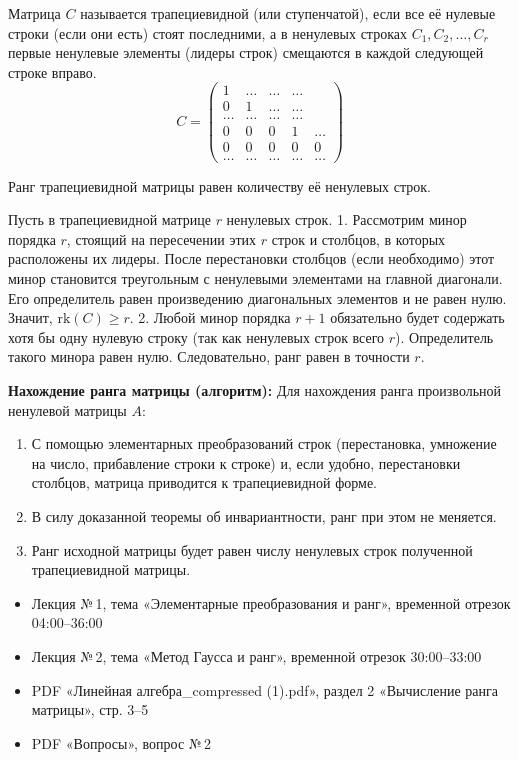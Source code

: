 \begin{definition}
Матрица $C$ называется трапециевидной (или ступенчатой), если все её нулевые строки (если они есть) стоят последними, а в ненулевых строках $C_1, C_2, \dots, C_r$ первые ненулевые элементы (лидеры строк) смещаются в каждой следующей строке вправо.
\[
C = \begin{pmatrix}
1 & \dots & \dots & \dots \\
0 & 1 & \dots & \dots \\
\dots & \dots & \dots & \dots \\
0 & 0 & 0 & 1 & \dots \\
0 & 0 & 0 & 0 & 0 \\
\dots & \dots & \dots & \dots & \dots
\end{pmatrix}
\]
\end{definition}

\begin{theorem}
Ранг трапециевидной матрицы равен количеству её ненулевых строк.
\end{theorem}

\begin{tcolorbox}[title=Доказательство, breakable]
Пусть в трапециевидной матрице $r$ ненулевых строк. 
1. Рассмотрим минор порядка $r$, стоящий на пересечении этих $r$ строк и столбцов, в которых расположены их лидеры. После перестановки столбцов (если необходимо) этот минор становится треугольным с ненулевыми элементами на главной диагонали. Его определитель равен произведению диагональных элементов и не равен нулю. Значит, $\mathrm{rk}(C) \ge r$.
2. Любой минор порядка $r+1$ обязательно будет содержать хотя бы одну нулевую строку (так как ненулевых строк всего $r$). Определитель такого минора равен нулю.
Следовательно, ранг равен в точности $r$.
\end{tcolorbox}

\textbf{Нахождение ранга матрицы (алгоритм):}
Для нахождения ранга произвольной ненулевой матрицы $A$:
\begin{enumerate}
    \item С помощью элементарных преобразований строк (перестановка, умножение на число, прибавление строки к строке) и, если удобно, перестановки столбцов, матрица приводится к трапециевидной форме.
    \item В силу доказанной теоремы об инвариантности, ранг при этом не меняется.
    \item Ранг исходной матрицы будет равен числу ненулевых строк полученной трапециевидной матрицы.
\end{enumerate}

\begin{tcolorbox}[title=Источники, colback=gray!10]
\begin{itemize}
  \item Лекция №\,1, тема «Элементарные преобразования и ранг», временной отрезок 04:00--36:00
  \item Лекция №\,2, тема «Метод Гаусса и ранг», временной отрезок 30:00--33:00
  \item PDF «Линейная алгебра\_compressed (1).pdf», раздел 2 «Вычисление ранга матрицы», стр. 3--5
  \item PDF «Вопросы», вопрос №\,2
\end{itemize}
\end{tcolorbox}
